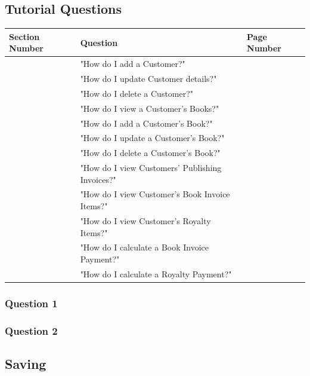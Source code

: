 \subsection{Tutorial Questions}

\begin{center}
\begin{tabular}{|p{3cm}|p{3cm}|p{3cm}|}
        \hline
        \textbf{Section Number} & \textbf{Question} & \textbf{Page Number} \\ \hline
        & "How do I add a Customer?" & \\ \hline
        & "How do I update Customer details?" & \\ \hline
        & "How do I delete a Customer?" & \\ \hline
        & "How do I view a Customer's Books?" & \\ \hline
        & "How do I add a Customer's Book?" & \\ \hline
        & "How do I update a Customer's Book?" & \\ \hline
        & "How do I delete a Customer's Book?" & \\ \hline
        & "How do I view Customers' Publishing Invoices?" & \\ \hline
        & "How do I view Customer's Book Invoice Items?" & \\ \hline
        & "How do I view Customer's Royalty Items?" & \\ \hline
        & "How do I calculate a Book Invoice Payment?" & \\ \hline
        & "How do I calculate a Royalty Payment?" & \\ \hline
\end{tabular}
\begin{center}

\subsubsection{Question 1}

\subsubsection{Question 2}

\subsection{Saving}


\end{center}
\end{center}
